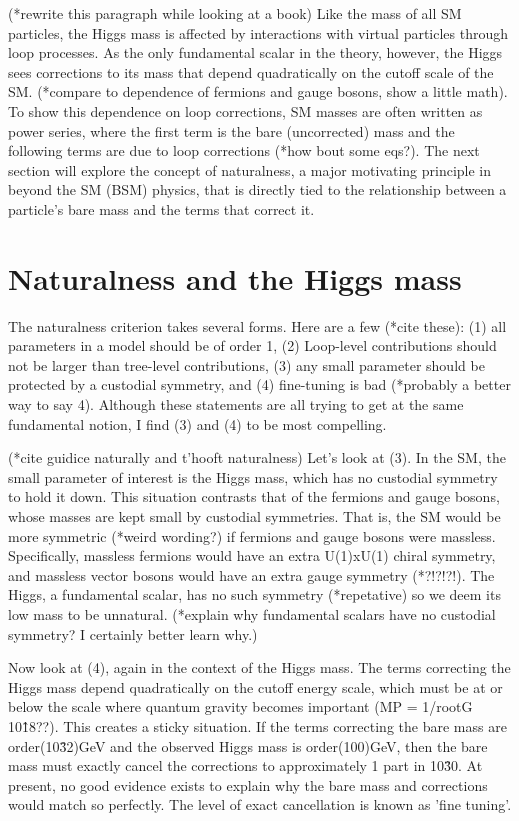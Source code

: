\documentclass[12pt]{article}
\begin{document}
    (*rewrite this paragraph while looking at a book)
    Like the mass of all SM particles, the Higgs mass is affected by interactions with virtual particles through loop processes. As the only fundamental scalar in the theory, however, the Higgs sees corrections to its mass that depend quadratically on the cutoff scale of the SM. (*compare to dependence of fermions and gauge bosons, show a little math). To show this dependence on loop corrections, SM masses are often written as power series, where the first term is the bare (uncorrected) mass and the following terms are due to loop corrections (*how bout some eqs?). The next section will explore the concept of naturalness, a major motivating principle in beyond the SM (BSM) physics, that is directly tied to the relationship between a particle's bare mass and the terms that correct it.

\section{Naturalness and the Higgs mass}
    The naturalness criterion takes several forms. Here are a few (*cite these): (1) all parameters in a model should be of order 1, (2) Loop-level contributions should not be larger than tree-level contributions, (3) any small parameter should be protected by a custodial symmetry, and (4) fine-tuning is bad (*probably a better way to say 4). Although these statements are all trying to get at the same fundamental notion, I find (3) and (4) to be most compelling.

    (*cite guidice naturally and t'hooft naturalness)
    Let's look at (3). In the SM, the small parameter of interest is the Higgs mass, which has no custodial symmetry to hold it down. This situation contrasts that of the fermions and gauge bosons, whose masses are kept small by custodial symmetries. That is, the SM would be more symmetric (*weird wording?) if fermions and gauge bosons were massless. Specifically, massless fermions would have an extra U(1)xU(1) chiral symmetry, and massless vector bosons would have an extra gauge symmetry (*?!?!?!). The Higgs, a fundamental scalar, has no such symmetry (*repetative) so we deem its low mass to be unnatural. (*explain why fundamental scalars have no custodial symmetry? I certainly better learn why.)

    Now look at (4), again in the context of the Higgs mass. The terms correcting the Higgs mass depend quadratically on the cutoff energy scale, which must be at or below the scale where quantum gravity becomes important (MP = 1/rootG ~ 10\^18??). This creates a sticky situation. If the terms correcting the bare mass are order(10\^32)GeV and the observed Higgs mass is order(100)GeV, then the bare mass must exactly cancel the corrections to approximately 1 part in 10\^30. At present, no good evidence exists to explain why the bare mass and corrections would match so perfectly. The level of exact cancellation is known as 'fine tuning'.
\end{document}
